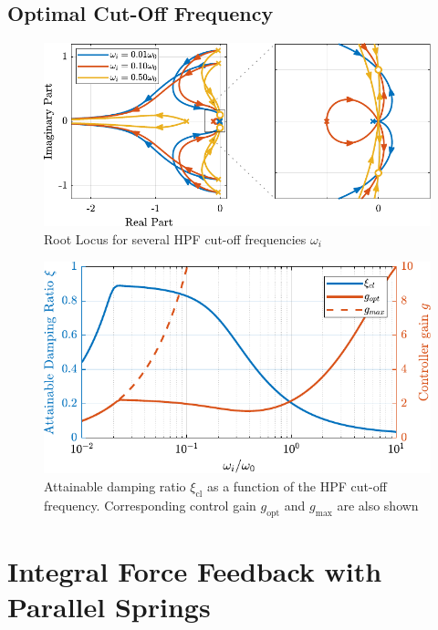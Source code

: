 \documentclass{ISMA_USD2020}
\begin{document}
\subsection{Optimal Cut-Off Frequency}
\label{sec:org7d8a789}

\begin{figure}[htbp]
\centering
\includegraphics[scale=1]{figs/root_locus_wi_modified_iff.pdf}
\caption{\label{fig:root_locus_wi_modified_iff}Root Locus for several HPF cut-off frequencies \(\omega_i\)}
\end{figure}

\begin{figure}[htbp]
\centering
\includegraphics[scale=1]{figs/mod_iff_damping_wi.pdf}
\caption{\label{fig:mod_iff_damping_wi}Attainable damping ratio \(\xi_\text{cl}\) as a function of the HPF cut-off frequency. Corresponding control gain \(g_\text{opt}\) and \(g_\text{max}\) are also shown}
\end{figure}

\section{Integral Force Feedback with Parallel Springs}
\label{sec:org9bc19d0}
\end{document}

